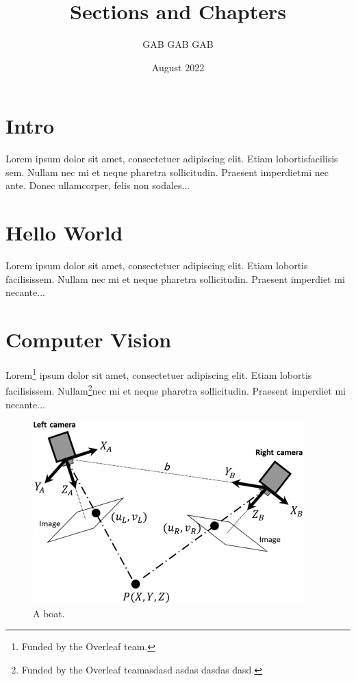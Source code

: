 \documentclass[12pt]{article}
\title{Sections and Chapters}
\author{GAB GAB GAB}
\date{August 2022}
\begin{document}
\onehalfspacing

\maketitle
  
\tableofcontents

\section{Intro}
   
Lorem  ipsum  dolor  sit  amet,  consectetuer  adipiscing  
elit.   Etiam  lobortisfacilisis sem.  Nullam nec mi et 
neque pharetra sollicitudin.  Praesent imperdietmi nec ante. 
Donec ullamcorper, felis non sodales...
       
\section{Hello World}

Lorem ipsum dolor sit amet, consectetuer adipiscing elit.  
Etiam lobortis facilisissem.  Nullam nec mi et neque pharetra 
sollicitudin.  Praesent imperdiet mi necante...

\section{Computer Vision}
       
Lorem\footnote{Funded by the Overleaf team.} ipsum dolor sit amet, consectetuer adipiscing elit.  
Etiam lobortis facilisissem.  Nullam\footnote{Funded by the Overleaf teamasdasd asdas dasdas dasd.}nec mi et neque pharetra 
sollicitudin.  Praesent imperdiet mi necante...

\begin{figure}[ht!]
  \centering
  \includegraphics{image.jpg}
  \caption{A boat.}
\end{figure}
\end{document}
